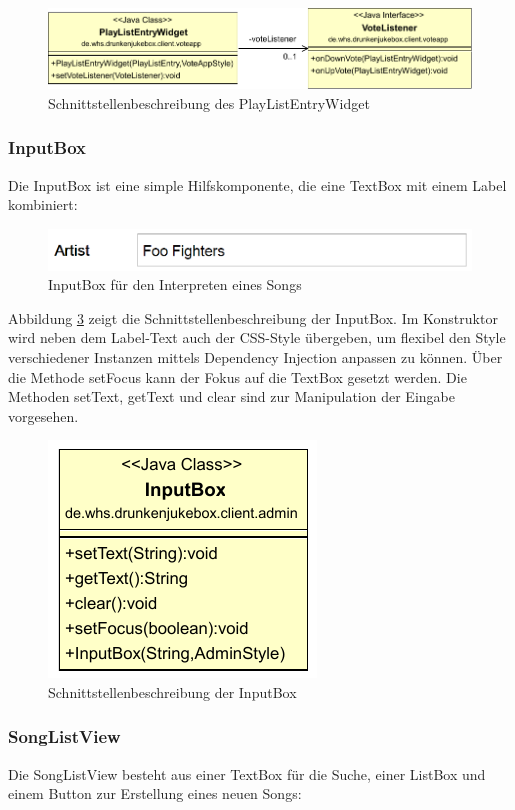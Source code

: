 \begin{figure}[tbh]
	\centering
	\includegraphics[width=1.0\linewidth]{Bilder/PlayListEntry.pdf}
	\caption{Schnittstellenbeschreibung des PlayListEntryWidget}
	\label{fig:PlayListEntryClass}
\end{figure}


\subsubsection{InputBox}
Die InputBox ist eine simple Hilfskomponente, die eine TextBox mit einem Label kombiniert:

\begin{figure}[H]
\centering
\includegraphics[width=0.7\linewidth]{Bilder/InputBox}
\caption{InputBox für den Interpreten eines Songs}
\label{fig:InputBox}
\end{figure}

Abbildung \ref{fig:InputBoxClass} zeigt die Schnittstellenbeschreibung der InputBox. Im Konstruktor wird neben dem Label-Text auch der CSS-Style übergeben, um flexibel den Style verschiedener Instanzen mittels Dependency Injection anpassen zu können. Über die Methode setFocus kann der Fokus auf die TextBox gesetzt werden. Die Methoden setText, getText und clear sind zur Manipulation der Eingabe vorgesehen.

\begin{figure}[H]
\centering
\includegraphics[width=0.3\linewidth]{Bilder/InputBoxClass}
\caption{Schnittstellenbeschreibung der InputBox}
\label{fig:InputBoxClass}
\end{figure}


\newpage
\subsubsection{SongListView}
Die SongListView besteht aus einer TextBox für die Suche, einer ListBox und einem Button zur Erstellung eines neuen Songs:

